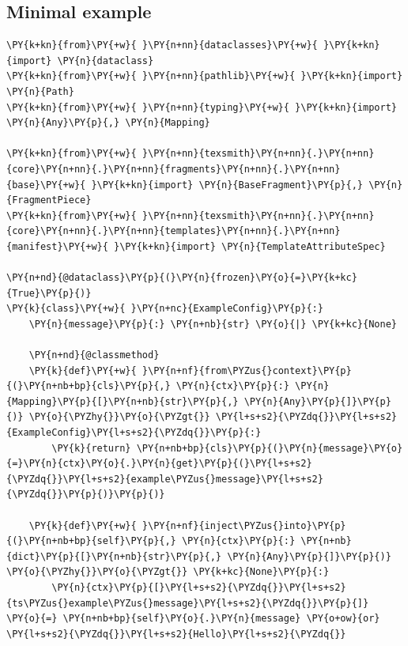 \documentclass[a4paper,twoside]{article}
\begin{document}
\subsection{Minimal example}
\begin{tscode}[lang=python, engine=pygments]
\begin{Verbatim}[commandchars=\\\{\},breaklines, breakanywhere, commandchars=\\\{\}]
\PY{k+kn}{from}\PY{+w}{ }\PY{n+nn}{dataclasses}\PY{+w}{ }\PY{k+kn}{import} \PY{n}{dataclass}
\PY{k+kn}{from}\PY{+w}{ }\PY{n+nn}{pathlib}\PY{+w}{ }\PY{k+kn}{import} \PY{n}{Path}
\PY{k+kn}{from}\PY{+w}{ }\PY{n+nn}{typing}\PY{+w}{ }\PY{k+kn}{import} \PY{n}{Any}\PY{p}{,} \PY{n}{Mapping}

\PY{k+kn}{from}\PY{+w}{ }\PY{n+nn}{texsmith}\PY{n+nn}{.}\PY{n+nn}{core}\PY{n+nn}{.}\PY{n+nn}{fragments}\PY{n+nn}{.}\PY{n+nn}{base}\PY{+w}{ }\PY{k+kn}{import} \PY{n}{BaseFragment}\PY{p}{,} \PY{n}{FragmentPiece}
\PY{k+kn}{from}\PY{+w}{ }\PY{n+nn}{texsmith}\PY{n+nn}{.}\PY{n+nn}{core}\PY{n+nn}{.}\PY{n+nn}{templates}\PY{n+nn}{.}\PY{n+nn}{manifest}\PY{+w}{ }\PY{k+kn}{import} \PY{n}{TemplateAttributeSpec}

\PY{n+nd}{@dataclass}\PY{p}{(}\PY{n}{frozen}\PY{o}{=}\PY{k+kc}{True}\PY{p}{)}
\PY{k}{class}\PY{+w}{ }\PY{n+nc}{ExampleConfig}\PY{p}{:}
    \PY{n}{message}\PY{p}{:} \PY{n+nb}{str} \PY{o}{|} \PY{k+kc}{None}

    \PY{n+nd}{@classmethod}
    \PY{k}{def}\PY{+w}{ }\PY{n+nf}{from\PYZus{}context}\PY{p}{(}\PY{n+nb+bp}{cls}\PY{p}{,} \PY{n}{ctx}\PY{p}{:} \PY{n}{Mapping}\PY{p}{[}\PY{n+nb}{str}\PY{p}{,} \PY{n}{Any}\PY{p}{]}\PY{p}{)} \PY{o}{\PYZhy{}}\PY{o}{\PYZgt{}} \PY{l+s+s2}{\PYZdq{}}\PY{l+s+s2}{ExampleConfig}\PY{l+s+s2}{\PYZdq{}}\PY{p}{:}
        \PY{k}{return} \PY{n+nb+bp}{cls}\PY{p}{(}\PY{n}{message}\PY{o}{=}\PY{n}{ctx}\PY{o}{.}\PY{n}{get}\PY{p}{(}\PY{l+s+s2}{\PYZdq{}}\PY{l+s+s2}{example\PYZus{}message}\PY{l+s+s2}{\PYZdq{}}\PY{p}{)}\PY{p}{)}

    \PY{k}{def}\PY{+w}{ }\PY{n+nf}{inject\PYZus{}into}\PY{p}{(}\PY{n+nb+bp}{self}\PY{p}{,} \PY{n}{ctx}\PY{p}{:} \PY{n+nb}{dict}\PY{p}{[}\PY{n+nb}{str}\PY{p}{,} \PY{n}{Any}\PY{p}{]}\PY{p}{)} \PY{o}{\PYZhy{}}\PY{o}{\PYZgt{}} \PY{k+kc}{None}\PY{p}{:}
        \PY{n}{ctx}\PY{p}{[}\PY{l+s+s2}{\PYZdq{}}\PY{l+s+s2}{ts\PYZus{}example\PYZus{}message}\PY{l+s+s2}{\PYZdq{}}\PY{p}{]} \PY{o}{=} \PY{n+nb+bp}{self}\PY{o}{.}\PY{n}{message} \PY{o+ow}{or} \PY{l+s+s2}{\PYZdq{}}\PY{l+s+s2}{Hello}\PY{l+s+s2}{\PYZdq{}}


\end{Verbatim}
\end{tscode}
\end{document}
